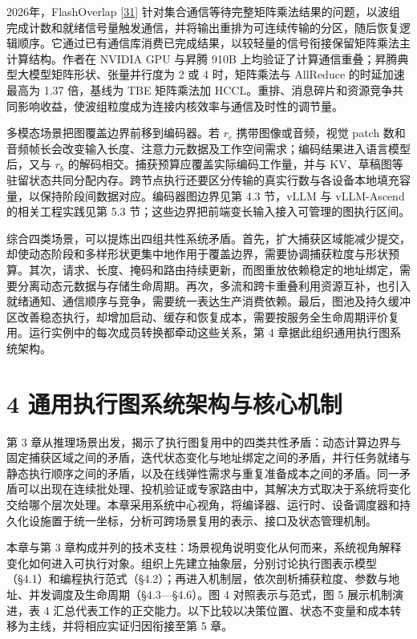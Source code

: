 \documentclass[UTF8,10.5pt,fontset=windows]{ctexart}
\begin{document}
2026年，FlashOverlap
{[}\protect\hyperlink{ref-hong2026flashoverlap}{31}{]}
针对集合通信等待完整矩阵乘法结果的问题，以波组完成计数和就绪信号量触发通信，并将输出重排为可连续传输的分区，随后恢复逻辑顺序。它通过已有通信库消费已完成结果，以较轻量的信号衔接保留矩阵乘法主计算结构。作者在
NVIDIA GPU 与昇腾 910B
上均验证了计算通信重叠；昇腾典型大模型矩阵形状、张量并行度为 2 或 4
时，矩阵乘法与 AllReduce 的时延加速最高为 1.37 倍，基线为 TBE 矩阵乘法加
HCCL。重排、消息碎片和资源竞争共同影响收益，使波组粒度成为连接内核效率与通信及时性的调节量。

多模态场景把图覆盖边界前移到编码器。若 \(r_c\) 携带图像或音频，视觉
patch
数和音频帧长会改变输入长度、注意力元数据及工作空间需求；编码结果进入语言模型后，又与
\(r_b\) 的解码相交。捕获预算应覆盖实际编码工作量，并与
KV、草稿图等驻留状态共同分配内存。跨节点执行还要区分传输的真实行数与各设备本地填充容量，以保持阶段间数据对应。编码器图边界见第
4.3 节，vLLM 与 vLLM-Ascend 的相关工程实践见第 5.3
节；这些边界把前端变长输入接入可管理的图执行区间。

综合四类场景，可以提炼出四组共性系统矛盾。首先，扩大捕获区域能减少提交，却使动态阶段和多样形状更集中地作用于覆盖边界，需要协调捕获粒度与形状预算。其次，请求、长度、掩码和路由持续更新，而图重放依赖稳定的地址绑定，需要分离动态元数据与存储生命周期。再次，多流和跨卡重叠利用资源互补，也引入就绪通知、通信顺序与竞争，需要统一表达生产消费依赖。最后，图池及持久缓冲区改善稳态执行，却增加启动、缓存和恢复成本，需要按服务全生命周期评价复用。运行实例中的每次成员转换都牵动这些关系，第
4 章据此组织通用执行图系统架构。

\hypertarget{section-4}{%
\section{4 通用执行图系统架构与核心机制}\label{section-4}}

第 3
章从推理场景出发，揭示了执行图复用中的四类共性矛盾：动态计算边界与固定捕获区域之间的矛盾，迭代状态变化与地址绑定之间的矛盾，并行任务就绪与静态执行顺序之间的矛盾，以及在线弹性需求与重复准备成本之间的矛盾。同一矛盾可以出现在连续批处理、投机验证或专家路由中，其解决方式取决于系统将变化交给哪个层次处理。本章采用系统中心视角，将编译器、运行时、设备调度器和持久化设施置于统一坐标，分析可跨场景复用的表示、接口及状态管理机制。

本章与第 3
章构成并列的技术支柱：场景视角说明变化从何而来，系统视角解释变化如何进入可执行对象。组织上先建立抽象层，分别讨论执行图表示模型（§4.1）和编程执行范式（§4.2）；再进入机制层，依次剖析捕获粒度、参数与地址、并发调度及生命周期（§4.3---§4.6）。图
4 对照表示与范式，图 5 展示机制演进，表 4
汇总代表工作的正交能力。以下比较以决策位置、状态不变量和成本转移为主线，并将相应实证归因衔接至第
5 章。
\end{document}

